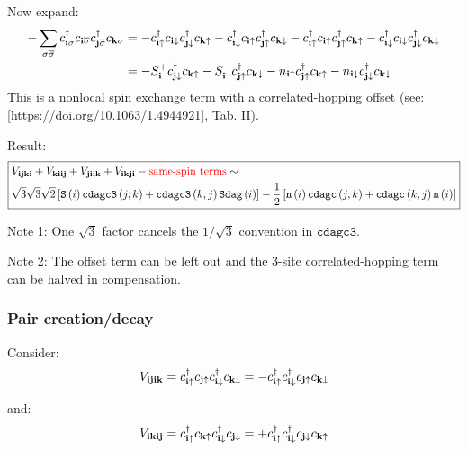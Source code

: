 \documentclass[12pt,paper=a4]{article}
\newcommand{\cs}[1]{c_{#1\sigma}}
\newcommand{\cdags}[1]{c^{\dagger}_{#1\sigma}}
\newcommand{\cS}[1]{c_{#1\overline{\sigma}}}
\newcommand{\cdagS}[1]{c^{\dagger}_{#1\overline{\sigma}}}
\newcommand{\cUP}[1]{c_{#1\uparrow}}
\newcommand{\cdagUP}[1]{c^{\dagger}_{#1\uparrow}}
\newcommand{\cDN}[1]{c_{#1\downarrow}}
\newcommand{\cdagDN}[1]{c^{\dagger}_{#1\downarrow}}
\newcommand{\nUP}[1]{n_{#1\uparrow}}
\newcommand{\nDN}[1]{n_{#1\downarrow}}
\begin{document}
Now expand:
\begin{equation}
\begin{split}
-\sum_{\sigma\overline{\sigma}} \cdags{\v{i}} \cS{\v{i}} \cdagS{\v{j}} \cs{\v{k}} 
&= 
-\cdagUP{\v{i}} \cDN{\v{i}} \cdagDN{\v{j}} \cUP{\v{k}}
-\cdagDN{\v{i}} \cUP{\v{i}} \cdagUP{\v{j}} \cDN{\v{k}}
-\cdagUP{\v{i}} \cUP{\v{i}} \cdagUP{\v{j}} \cUP{\v{k}}
-\cdagDN{\v{i}} \cDN{\v{i}} \cdagDN{\v{j}} \cDN{\v{k}} \\
&= 
-S^+_{\v{i}} \cdagDN{\v{j}} \cUP{\v{k}} 
-S^-_{\v{i}} \cdagUP{\v{j}} \cDN{\v{k}}
-\nUP{\v{i}} \cdagUP{\v{j}} \cUP{\v{k}}
-\nDN{\v{i}} \cdagDN{\v{j}} \cDN{\v{k}}
\end{split}
\end{equation}
This is a nonlocal spin exchange term with a correlated-hopping offset (see: [\url{https://doi.org/10.1063/1.4944921}], Tab. II).

Result:
\begin{equation}
\boxed{
\begin{split} 
&V_{\mathbf{ijki}} + V_{\mathbf{kiij}} + V_{\mathbf{jiik}} + V_{\mathbf{ikji}} - {\color{red}\text{same-spin terms}} 
\sim \\
&\sqrt{3}\sqrt{3}\sqrt{2} \left[ \mathtt{S}\left(i\right) \mathtt{cdagc3}\left(j,k\right) + \mathtt{cdagc3}\left(k,j\right) \mathtt{Sdag}\left(i\right) \right]
-\frac{1}{2} \left[ \mathtt{n}\left(i\right) \mathtt{cdagc}\left(j,k\right) +  \mathtt{cdagc}\left(k,j\right) \mathtt{n}\left(i\right) \right]
\end{split}
}
\end{equation}

Note 1: One $\sqrt{3}$ factor cancels the $1/\sqrt{3}$ convention in $\mathtt{cdagc3}$.

Note 2: The offset term can be left out and the 3-site correlated-hopping term can be halved in compensation.

\subsubsection{Pair creation/decay}

Consider:
\begin{equation}
V_{\v{ijik}} = \cdagUP{\v{i}} \cUP{\v{j}} \cdagDN{\v{i}} \cDN{\v{k}} 
= - \cdagUP{\v{i}}\cdagDN{\v{i}} \cUP{\v{j}}\cDN{\v{k}}
\end{equation}

and: 
\begin{equation}
V_{\v{ikij}} = \cdagUP{\v{i}} \cUP{\v{k}} \cdagDN{\v{i}} \cDN{\v{j}} 
= +\cdagUP{\v{i}}\cdagDN{\v{i}} \cDN{\v{j}}\cUP{\v{k}}
\end{equation}
\end{document}
